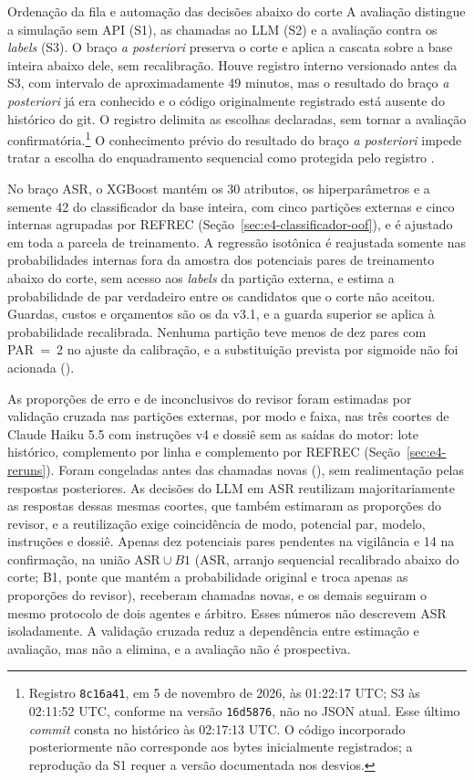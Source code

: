 \begin{chapter}{Ordenação da fila e automação das decisões abaixo do corte}
A avaliação distingue a simulação sem API (S1), as chamadas ao LLM (S2) e a avaliação contra os \textit{labels} (S3). O braço \textit{a posteriori} preserva o corte e aplica a cascata sobre a base inteira abaixo dele, sem recalibração. Houve registro interno versionado antes da S3, com intervalo de aproximadamente 49 minutos, mas o resultado do braço \textit{a posteriori} já era conhecido e o código originalmente registrado está ausente do histórico do git. O registro delimita as escolhas declaradas, sem tornar a avaliação confirmatória.\footnote{Registro \texttt{8c16a41}, em 5 de novembro de 2026, às 01:22:17 UTC; S3 às 02:11:52 UTC, conforme  na versão \texttt{16d5876}, não no JSON atual. Esse último \textit{commit} consta no histórico às 02:17:13 UTC. O código incorporado posteriormente não corresponde aos bytes inicialmente registrados; a reprodução da S1 requer a versão documentada nos desvios.} O conhecimento prévio do resultado do braço \textit{a posteriori} impede tratar a escolha do enquadramento sequencial como protegida pelo registro \cite{Jardim2026phdrepo}.

No braço ASR, o XGBoost mantém os 30 atributos, os hiperparâmetros e a semente 42 do classificador da base inteira, com cinco partições externas e cinco internas agrupadas por REFREC (Seção~\ref{sec:e4-classificador-oof}), e é ajustado em toda a parcela de treinamento. A regressão isotônica é reajustada somente nas probabilidades internas fora da amostra dos potenciais pares de treinamento abaixo do corte, sem acesso aos \textit{labels} da partição externa, e estima a probabilidade de par verdadeiro entre os candidatos que o corte não aceitou. Guardas, custos e orçamentos são os da v3.1, e a guarda superior se aplica à probabilidade recalibrada. Nenhuma partição teve menos de dez pares com PAR~=~2 no ajuste da calibração, e a substituição prevista por sigmoide não foi acionada ().

As proporções de erro e de inconclusivos do revisor foram estimadas por validação cruzada nas partições externas, por modo e faixa, nas três coortes de Claude Haiku 5.5 com instruções v4 e dossiê sem as saídas do motor: lote histórico, complemento por linha e complemento por REFREC (Seção~\ref{sec:e4-reruns}). Foram congeladas antes das chamadas novas (), sem realimentação pelas respostas posteriores. As decisões do LLM em ASR reutilizam majoritariamente as respostas dessas mesmas coortes, que também estimaram as proporções do revisor, e a reutilização exige coincidência de modo, potencial par, modelo, instruções e dossiê. Apenas dez potenciais pares pendentes na vigilância e 14 na confirmação, na união $\mathrm{ASR}\cup B1$ (ASR, arranjo sequencial recalibrado abaixo do corte; B1, ponte que mantém a probabilidade original e troca apenas as proporções do revisor), receberam chamadas novas, e os demais seguiram o mesmo protocolo de dois agentes e árbitro. Esses números não descrevem ASR isoladamente. A validação cruzada reduz a dependência entre estimação e avaliação, mas não a elimina, e a avaliação não é prospectiva.


\end{chapter}
